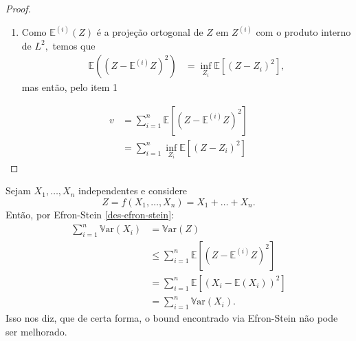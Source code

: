 \documentclass[12pt,a4paper,oneside]{book}
\theoremstyle{definition}
\theoremstyle{remark}
\numberwithin{equation}{section}
\newcommand{\E}{\mathbb{E}}
\newcommand{\Var}{\mathbb{V}\text{ar}}
\begin{document}
\begin{proof}
\begin{enumerate}
\begin{proof}
Utilizando \ref{prop-indpe-condc},
\begin{align*}
\E( (X-Y)^2|\mathcal{F})&= \E(X^2|\mathcal{F}) + \E(Y^2|\mathcal{F}) - 2\E(XY|\mathcal{F})\\
& =  \E(X^2|\mathcal{F}) + \E(Y^2|\mathcal{F}) - 2\E(X|\mathcal{F})\E(Y|\mathcal{F})\\
& =  \E(X^2|\mathcal{F}) + \E(X^2|\mathcal{F}) - 2\E(X|\mathcal{F})^2\\
& = 2\Var(X|\mathcal{F}).
\end{align*}
\end{proof}

Mas então, temos que
\begin{align*}
v &= \sum_{i=1}^n \E\left[\left( Z-\E^{(i)}Z\right)^2\right] \\
&= \sum_{i=1}^n \E\left[\E^{(i)}\left(\left( Z-\E^{(i)}Z\right)^2\right)\right]\\
&= \sum_{i=1}^n \E\left( \Var^{(i)}(Z)\right)\\
&= \dfrac{1}{2}\sum_{i=1}^n \E\left( \E^{(i)}\left[(Z-Z_i')^2\right]\right)\\
&= \dfrac{1}{2}\sum_{i=1}^n \E\left[\left( Z-Z_i'\right)^2\right]\\
&= \dfrac{1}{2}\sum_{i=1}^n \E\left[\left( Z-Z_i'\right)^2\right]\\
&= \sum_{i=1}^n\E\left[\left(Z-Z_i' \right)_+^2\right]=\sum_{i=1}^n\E\left[\left(Z-Z_i' \right)_-^2\right],
\end{align*}
onde a última igualdade é verdade já que $Z-Z'_i$ é simétrica. Além disso, é fácil ver que $Z$ e $Z'_i$ são independentes com respeito à $X^{(i)}.$

\item Como $\E^{(i)}(Z)$ é a projeção ortogonal de $Z$ em $Z^{(i)}$ com o produto interno de $L^2,$ temos que
\begin{align*}
\E((Z-\E^{(i)}Z)^2)&=  \inf_{Z_i}\E\left[ (Z-Z_i)^2 \right],
\end{align*}
mas então, pelo item 1
\end{enumerate}
\begin{align*}
v &= \sum_{i=1}^n \E\left[\left( Z-\E^{(i)}Z\right)^2\right] \\
&= \sum_{i=1}^n  \inf_{Z_i}\E\left[ (Z-Z_i)^2 \right]
\end{align*}
\end{proof}

\begin{tcolorbox}[colback = yellow!60]
Sejam $X_1,\dots,X_n$ independentes e considere 
$$Z =  f(X_1,\dots,X_n) = X_1+\dots+X_n.$$
Então, por Efron-Stein \ref{des-efron-stein}:
\begin{align*}
\sum_{i=1}^n\Var(X_i) &= \Var(Z)\\
&\leq  \sum_{i=1}^n \E\left[\left( Z-\E^{(i)}Z\right)^2\right]\\
&= \sum_{i=1}^n \E\left[\left( X_i - \E(X_i)\right)^2\right]\\
&= \sum_{i=1}^n\Var(X_i).
\end{align*}
Isso nos diz, que de certa forma, o bound encontrado via Efron-Stein não pode ser melhorado.
\end{tcolorbox}
\newpage
\end{document}
